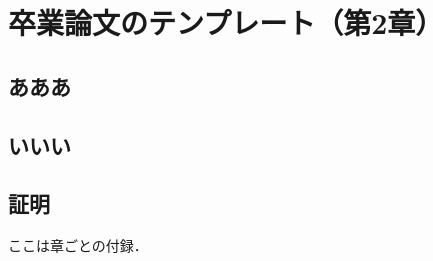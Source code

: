\documentclass[../main/main]{subfiles}
\begin{document}
\chapter{卒業論文のテンプレート（第2章）}

\section{あああ}
\section{いいい}

\begin{subappendices}
  \section{証明}
  ここは章ごとの付録．
\end{subappendices}


\end{document}

